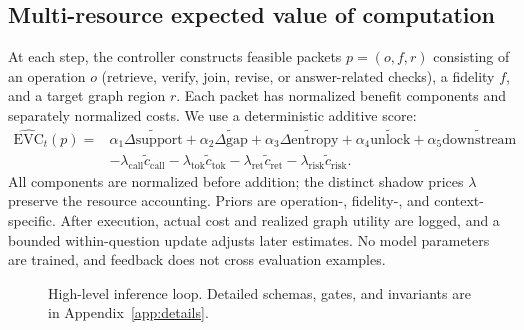 \subsection{Multi-resource expected value of computation}
At each step, the controller constructs feasible packets $p=(o,f,r)$ consisting of an operation $o$ (retrieve, verify, join, revise, or answer-related checks), a fidelity $f$, and a target graph region $r$. Each packet has normalized benefit components and separately normalized costs. We use a deterministic additive score:
\begin{align}
\widehat{\mathrm{EVC}}_t(p)={}&\alpha_1\widetilde{\Delta\mathrm{support}}+\alpha_2\widetilde{\Delta\mathrm{gap}}+\alpha_3\widetilde{\Delta\mathrm{entropy}}+\alpha_4\widetilde{\mathrm{unlock}}+\alpha_5\widetilde{\mathrm{downstream}} \nonumber\\
&-\lambda_{\mathrm{call}}\widetilde c_{\mathrm{call}}-\lambda_{\mathrm{tok}}\widetilde c_{\mathrm{tok}}-\lambda_{\mathrm{ret}}\widetilde c_{\mathrm{ret}}-\lambda_{\mathrm{risk}}\widetilde c_{\mathrm{risk}}.
\label{eq:evc}
\end{align}
All components are normalized before addition; the distinct shadow prices $\lambda$ preserve the resource accounting. Priors are operation-, fidelity-, and context-specific. After execution, actual cost and realized graph utility are logged, and a bounded within-question update adjusts later estimates. No model parameters are trained, and feedback does not cross evaluation examples.

\begin{figure}[t]
\centering
{}
\caption{High-level \method{} inference loop. Detailed schemas, gates, and invariants are in Appendix~\ref{app:details}.}
\label{alg:tdca}
\end{figure}

